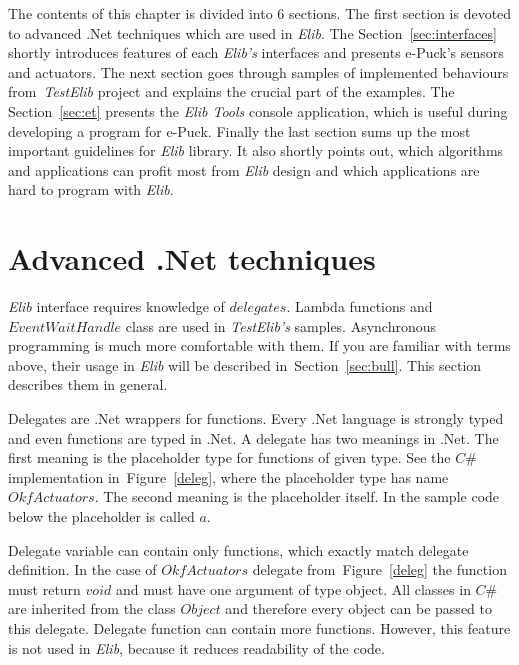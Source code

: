   The contents of this chapter is divided into 6 sections.
  The first section is devoted to advanced .Net techniques which are used in {\it Elib}.
  The Section~\ref{sec:interfaces} shortly introduces features of each {\it Elib's} interfaces and 
   presents e-Puck's sensors and actuators.
  The next section goes through samples of implemented behaviours 
  from~{\it TestElib} project and explains the crucial part of the examples.
  The Section~\ref{sec:et} presents the {\it Elib Tools} console application, 
  which is useful during developing a program for e-Puck.
  Finally the last section sums up the most important guidelines for {\it Elib} library.
  It also shortly points out, which algorithms and applications can profit most
  from {\it Elib} design and which applications are hard to program with {\it Elib}.
  
\section{Advanced .Net techniques} \label{sec:net}
  {\it Elib} interface requires knowledge of $delegates$. 
  Lambda functions and $EventWaitHandle$ class
  are used in {\it TestElib's} samples. 
  Asynchronous programming is much more comfortable with them.
  If you are familiar with terms above, their usage in {\it Elib} will be described 
  in~Section~\ref{sec:bull}.
  This section describes them in general.

  Delegates are .Net wrappers for functions. Every .Net language is strongly typed and even functions are typed in .Net.
  A delegate has two meanings in .Net. The first meaning is the placeholder type for functions of given type. 
  See the $C\#$ implementation in~Figure~\ref{deleg}, where the placeholder type has name $OkfActuators$.
  The second meaning is the placeholder itself. In the sample code below the placeholder is called $a$.

  Delegate variable can contain only functions, which exactly match delegate definition. In the case of $OkfActuators$ 
  delegate from~Figure~\ref{deleg} the function must return
  $void$ and must have one argument of type object. All classes in $C\#$ 
  are inherited from the class $Object$ and therefore every object can be passed to this delegate. 
  Delegate function can contain more functions. However, this feature is not used in {\it Elib}, 
  because it reduces readability of the code.
  

